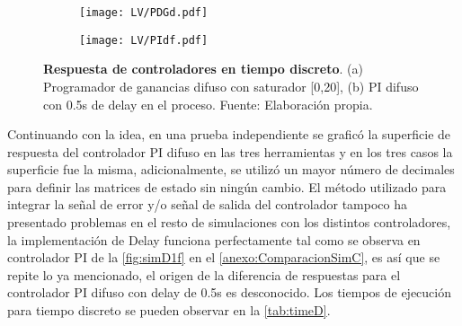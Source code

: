         \begin{figure}[htb]
            \centering
            \begin{subfigure}[t]{0.49\textwidth}
                \centering
                \texttt{[image: LV/PDGd.pdf]}
                \caption{}
                \label{fig:PDGd}
            \end{subfigure}
            \hfill
            \begin{subfigure}[t]{0.49\textwidth}
                \centering
                \texttt{[image: LV/PIdf.pdf]}
                \caption{}
                \label{fig:PIdf}
            \end{subfigure}
            \caption[Respuesta de controladores en tiempo discreto - PDG y PI difuso]{\textbf{Respuesta de controladores en tiempo discreto}. (a) Programador de ganancias difuso con saturador [0,20], (b) PI difuso con 0.5s de delay en el proceso. Fuente: Elaboración propia. \label{fig:comparacionD}}
        \end{figure}


        Continuando con la idea, en una prueba independiente se graficó la superficie de respuesta del controlador PI difuso en las tres herramientas y en los tres casos la superficie fue la misma, adicionalmente, se utilizó un mayor número de decimales para definir las matrices de estado sin ningún cambio. El método utilizado para integrar la señal de error y/o señal de salida del controlador tampoco ha presentado problemas en el resto de simulaciones con los distintos controladores, la implementación de Delay funciona perfectamente tal como se observa en controlador PI de la \cref{fig:simD1f} en el \ref{anexo:ComparacionSimC}, es así que se repite lo ya mencionado, el origen de la diferencia de respuestas para el controlador PI difuso con delay de 0.5s es desconocido. Los tiempos de ejecución para tiempo discreto se pueden observar en la \cref{tab:timeD}.

